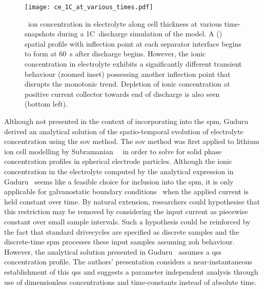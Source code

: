 \begin{figure}[!htbp]
    \centering
    \texttt{[image: ce\_1C\_at\_various\_times.pdf]}
    \caption[Electrolyte conc.\ (time-snapshots) along cell thickness for 1C~discharge]{~ion concentration in electrolyte along cell thickness
        at various time-snapshots during a 1C~discharge simulation of the
         model. A  () spatial
        profile  with inflection point at each separator interface begins to
        form at \approx \SI{60}{\second} after discharge begins. However, the
        ionic concentration in electrolyte exhibits a significantly different
        transient behaviour (zoomed inset) possessing another inflection point
        that disrupts the monotonic trend. Depletion of ionic concentration at
        positive current collector  towards end of discharge is also seen
    (bottom left).}
    \label{fig:ce1cdischgwithzoom}
\end{figure}

Although  not presented  in the  context  of incorporating  into the  \gls{spm},
Guduru~\etal~\cite{Guduru2012}   derived   an   analytical   solution   of   the
spatio-temporal  evolution  of  electrolyte concentration  using  the  \gls{sov}
method. The \gls{sov} method was first  applied to lithium ion cell modelling by
Subramanian~\etal~\cite{Subramanian2001a}  in order  to  solve  for solid  phase
concentration  profiles in  spherical  electrode particles.  Although the  ionic
concentration  in  the electrolyte  computed  by  the analytical  expression  in
Guduru~\etal{} seems like a feasible choice for inclusion into the \gls{spm}, it
is only applicable for galvanostatic  boundary conditions \ie~when the applied
current  is held  constant over  time. By  natural extension,  researchers could
hypothesise  that this  restriction  may  be removed  by  considering the  input
current as  piecewise constant  over small sample  intervals. Such  a hypothesis
could  be  reinforced  by  the  fact that  standard  drivecycles  are  specified
as  discrete  samples and  the  discrete-time  \gls{spm} processes  these  input
samples assuming \gls{zoh} behaviour. However, the analytical solution presented
in  Guduru~\etal{}  assumes  a  \gls{qss} concentration  profile.  The  authors'
presentation  considers a  near-instantaneous  establishment  of this  \gls{qss}
and  suggests a  parameter  independent analysis  through  use of  dimensionless
concentrations and time-constants instead of absolute time.

